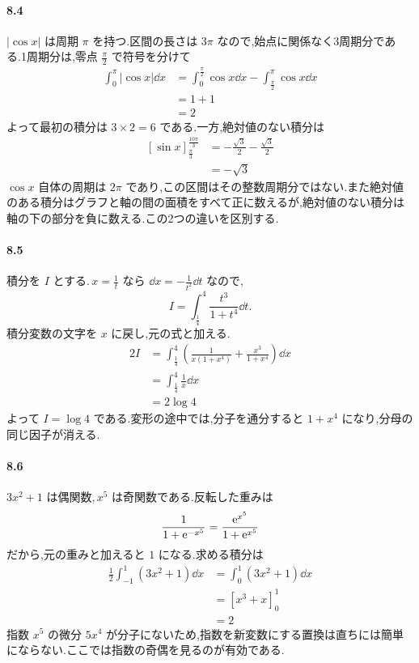 \paragraph{8.4}
$|\cos x|$ は周期 $\pi$ を持つ.区間の長さは $3\pi$ なので,始点に関係なく3周期分である.1周期分は,零点 $\frac{\pi}{2}$ で符号を分けて
\[
\begin{aligned}
\int_0^\pi|\cos x|\dd x
 &=\int_0^{\frac{\pi}{2}}\cos x\dd x
  -\int_{\frac{\pi}{2}}^\pi\cos x\dd x\\
 &=1+1\\
 &=2
\end{aligned}
\]
よって最初の積分は $3\times2=6$ である.一方,絶対値のない積分は
\[
\begin{aligned}
\left[\sin x\right]_{\frac{\pi}{3}}^{\frac{10\pi}{3}}
 &=-\frac{\sqrt3}{2}-\frac{\sqrt3}{2}\\
 &=-\sqrt3
\end{aligned}
\]
$\cos x$ 自体の周期は $2\pi$ であり,この区間はその整数周期分ではない.また絶対値のある積分はグラフと軸の間の面積をすべて正に数えるが,絶対値のない積分は軸の下の部分を負に数える.この2つの違いを区別する.

\paragraph{8.5}
積分を $I$ とする.\,$x=\frac1t$ なら $\dd x=-\frac1{t^2}\dd t$ なので,
\[
I=\int_{\frac14}^4\frac{t^3}{1+t^4}\dd t.
\]
積分変数の文字を $x$ に戻し,元の式と加える.
\[
\begin{aligned}
2I&=\int_{\frac14}^4
\left(\frac{1}{x(1+x^4)}+\frac{x^3}{1+x^4}\right)\dd x\\
 &=\int_{\frac14}^4\frac{1}{x}\dd x\\
 &=2\log4
\end{aligned}
\]
よって $I=\log4$ である.変形の途中では,分子を通分すると $1+x^4$ になり,分母の同じ因子が消える.

\paragraph{8.6}
$3x^2+1$ は偶関数,\,$x^5$ は奇関数である.反転した重みは
\[
\frac{1}{1+\mathrm{e}^{-x^5}}=\frac{\mathrm{e}^{x^5}}{1+\mathrm{e}^{x^5}}
\]
だから,元の重みと加えると $1$ になる.求める積分は
\[
\begin{aligned}
\frac12\int_{-1}^1(3x^2+1)\dd x
 &=\int_0^1(3x^2+1)\dd x\\
 &=\left[x^3+x\right]_0^1\\
 &=2
\end{aligned}
\]
指数 $x^5$ の微分 $5x^4$ が分子にないため,指数を新変数にする置換は直ちには簡単にならない.ここでは指数の奇偶を見るのが有効である.

